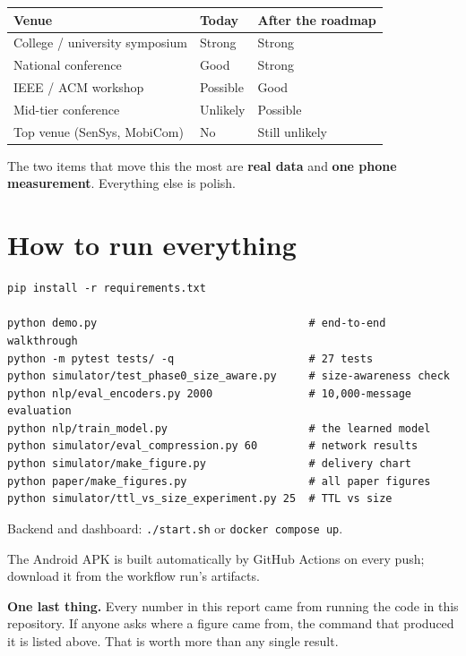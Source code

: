 \documentclass[11pt,a4paper]{article}
\begin{document}
\begin{center}
\begin{tabular}{p{6.4cm} p{3.0cm} p{4.4cm}}
\toprule
\textbf{Venue} & \textbf{Today} & \textbf{After the roadmap} \\
\midrule
College / university symposium & Strong & Strong \\
National conference & Good & Strong \\
IEEE / ACM workshop & Possible & Good \\
Mid-tier conference & Unlikely & Possible \\
Top venue (SenSys, MobiCom) & No & Still unlikely \\
\bottomrule
\end{tabular}
\end{center}

The two items that move this the most are \textbf{real data} and \textbf{one
phone measurement}. Everything else is polish.

\section{How to run everything}

\begin{verbatim}
pip install -r requirements.txt

python demo.py                                 # end-to-end walkthrough
python -m pytest tests/ -q                     # 27 tests
python simulator/test_phase0_size_aware.py     # size-awareness check
python nlp/eval_encoders.py 2000               # 10,000-message evaluation
python nlp/train_model.py                      # the learned model
python simulator/eval_compression.py 60        # network results
python simulator/make_figure.py                # delivery chart
python paper/make_figures.py                   # all paper figures
python simulator/ttl_vs_size_experiment.py 25  # TTL vs size
\end{verbatim}

Backend and dashboard: \texttt{./start.sh} or \texttt{docker compose up}.

The Android APK is built automatically by GitHub Actions on every push;
download it from the workflow run's artifacts.

\vspace{1em}
\begin{tcolorbox}[colback=soft,colframe=ink!30,boxrule=0.5pt]
\textbf{One last thing.} Every number in this report came from running the
code in this repository. If anyone asks where a figure came from, the command
that produced it is listed above. That is worth more than any single result.
\end{tcolorbox}
\end{document}
